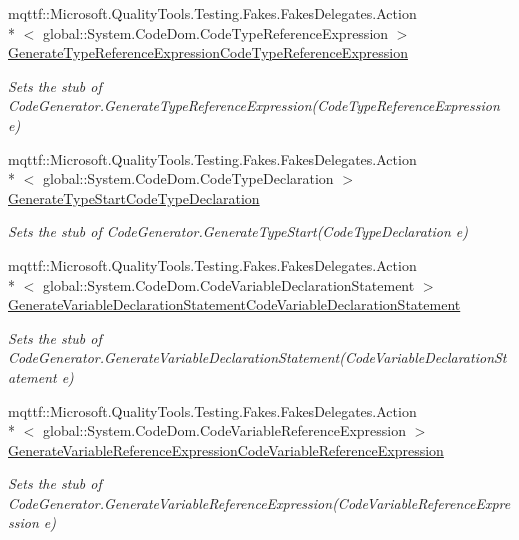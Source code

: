 \begin{DoxyCompactItemize}
mqttf\-::\-Microsoft.\-Quality\-Tools.\-Testing.\-Fakes.\-Fakes\-Delegates.\-Action\\*
$<$ global\-::\-System.\-Code\-Dom.\-Code\-Type\-Reference\-Expression $>$ \hyperlink{class_system_1_1_code_dom_1_1_compiler_1_1_fakes_1_1_stub_code_compiler_a4c92f962e1ed07ba07974732276b28d3}{Generate\-Type\-Reference\-Expression\-Code\-Type\-Reference\-Expression}
\begin{DoxyCompactList}\small\item\em Sets the stub of Code\-Generator.\-Generate\-Type\-Reference\-Expression(\-Code\-Type\-Reference\-Expression e)\end{DoxyCompactList}\item 
mqttf\-::\-Microsoft.\-Quality\-Tools.\-Testing.\-Fakes.\-Fakes\-Delegates.\-Action\\*
$<$ global\-::\-System.\-Code\-Dom.\-Code\-Type\-Declaration $>$ \hyperlink{class_system_1_1_code_dom_1_1_compiler_1_1_fakes_1_1_stub_code_compiler_a76981450d330c2e1d54afe57f6d5f4e9}{Generate\-Type\-Start\-Code\-Type\-Declaration}
\begin{DoxyCompactList}\small\item\em Sets the stub of Code\-Generator.\-Generate\-Type\-Start(\-Code\-Type\-Declaration e)\end{DoxyCompactList}\item 
mqttf\-::\-Microsoft.\-Quality\-Tools.\-Testing.\-Fakes.\-Fakes\-Delegates.\-Action\\*
$<$ global\-::\-System.\-Code\-Dom.\-Code\-Variable\-Declaration\-Statement $>$ \hyperlink{class_system_1_1_code_dom_1_1_compiler_1_1_fakes_1_1_stub_code_compiler_ad9c9d0d7d0a0a9d46decc2432a36836a}{Generate\-Variable\-Declaration\-Statement\-Code\-Variable\-Declaration\-Statement}
\begin{DoxyCompactList}\small\item\em Sets the stub of Code\-Generator.\-Generate\-Variable\-Declaration\-Statement(\-Code\-Variable\-Declaration\-Statement e)\end{DoxyCompactList}\item 
mqttf\-::\-Microsoft.\-Quality\-Tools.\-Testing.\-Fakes.\-Fakes\-Delegates.\-Action\\*
$<$ global\-::\-System.\-Code\-Dom.\-Code\-Variable\-Reference\-Expression $>$ \hyperlink{class_system_1_1_code_dom_1_1_compiler_1_1_fakes_1_1_stub_code_compiler_adc77514c772df1de685a8172a423e584}{Generate\-Variable\-Reference\-Expression\-Code\-Variable\-Reference\-Expression}
\begin{DoxyCompactList}\small\item\em Sets the stub of Code\-Generator.\-Generate\-Variable\-Reference\-Expression(\-Code\-Variable\-Reference\-Expression e)\end{DoxyCompactList}\item 

\end{DoxyCompactItemize}
